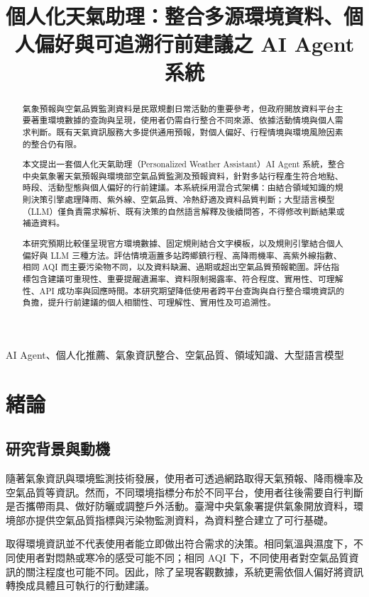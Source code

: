 \documentclass[conference]{IEEEtran}
\title{個人化天氣助理：整合多源環境資料、個人偏好與可追溯行前建議之 AI Agent 系統}
\author{
\IEEEauthorblockN{作者姓名}
\IEEEauthorblockA{單位名稱\\
臺灣\\
電子郵件：author@example.com}
}
\begin{document}
\maketitle

\begin{abstract}
氣象預報與空氣品質監測資料是民眾規劃日常活動的重要參考，但政府開放資料平台主要著重環境數據的查詢與呈現，使用者仍需自行整合不同來源、依據活動情境與個人需求判斷。既有天氣資訊服務大多提供通用預報，對個人偏好、行程情境與環境風險因素的整合仍有限。

本文提出一套個人化天氣助理（Personalized Weather Assistant）AI Agent 系統，整合中央氣象署天氣預報與環境部空氣品質監測及預報資料，針對多站行程產生符合地點、時段、活動型態與個人偏好的行前建議。本系統採用混合式架構：由結合領域知識的規則決策引擎處理降雨、紫外線、空氣品質、冷熱舒適及資料品質判斷；大型語言模型（LLM）僅負責需求解析、既有決策的自然語言解釋及後續問答，不得修改判斷結果或補造資料。

本研究預期比較僅呈現官方環境數據、固定規則結合文字模板，以及規則引擎結合個人偏好與 LLM 三種方法。評估情境涵蓋多站跨鄉鎮行程、高降雨機率、高紫外線指數、相同 AQI 而主要污染物不同，以及資料缺漏、過期或超出空氣品質預報範圍。評估指標包含建議可重現性、重要提醒遺漏率、資料限制揭露率、符合程度、實用性、可理解性、API 成功率與回應時間。本研究期望降低使用者跨平台查詢與自行整合環境資訊的負擔，提升行前建議的個人相關性、可理解性、實用性及可追溯性。
\end{abstract}

\begin{IEEEkeywords}
AI Agent、個人化推薦、氣象資訊整合、空氣品質、領域知識、大型語言模型
\end{IEEEkeywords}

\section{緒論}

\subsection{研究背景與動機}
隨著氣象資訊與環境監測技術發展，使用者可透過網路取得天氣預報、降雨機率及空氣品質等資訊。然而，不同環境指標分布於不同平台，使用者往後需要自行判斷是否攜帶雨具、做好防曬或調整戶外活動。臺灣中央氣象署提供氣象開放資料，環境部亦提供空氣品質指標與污染物監測資料，為資料整合建立了可行基礎。

取得環境資訊並不代表使用者能立即做出符合需求的決策。相同氣溫與濕度下，不同使用者對悶熱或寒冷的感受可能不同；相同 AQI 下，不同使用者對空氣品質資訊的關注程度也可能不同。因此，除了呈現客觀數據，系統更需依個人偏好將資訊轉換成具體且可執行的行動建議。
\end{document}
